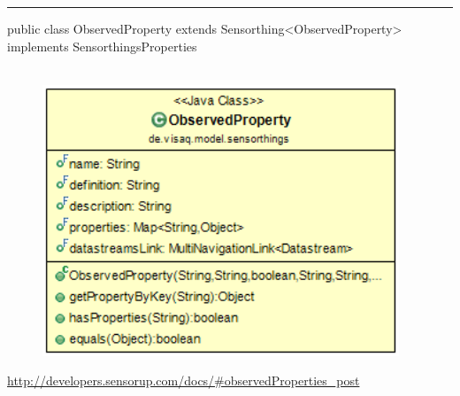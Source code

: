 \rule{\textwidth}{0.4pt}
public class ObservedProperty extends Sensorthing<ObservedProperty> implements SensorthingsProperties
\\\\
\begin{minipage}{0.4\textwidth}
    \begin{figure}[H]
        {\centering\includegraphics[width=0.95\textwidth]{media/backend/modell/classes/ObservedProperty.png}}
    \end{figure}
    \end{minipage} \hfill
\begin{minipage}{0.6\textwidth}
    \url{http://developers.sensorup.com/docs/#observedProperties_post}
\end{minipage}

